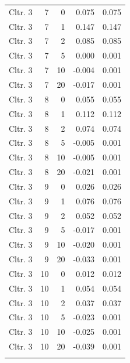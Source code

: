 \begin{longtable}{lrrrr}
  Cltr. 3 &    7 &    0 & 0.075 & 0.075 \\ 
  Cltr. 3 &    7 &    1 & 0.147 & 0.147 \\ 
  Cltr. 3 &    7 &    2 & 0.085 & 0.085 \\ 
  Cltr. 3 &    7 &    5 & 0.000 & 0.001 \\ 
  Cltr. 3 &    7 &   10 & -0.004 & 0.001 \\ 
  Cltr. 3 &    7 &   20 & -0.017 & 0.001 \\ 
  Cltr. 3 &    8 &    0 & 0.055 & 0.055 \\ 
  Cltr. 3 &    8 &    1 & 0.112 & 0.112 \\ 
  Cltr. 3 &    8 &    2 & 0.074 & 0.074 \\ 
  Cltr. 3 &    8 &    5 & -0.005 & 0.001 \\ 
  Cltr. 3 &    8 &   10 & -0.005 & 0.001 \\ 
  Cltr. 3 &    8 &   20 & -0.021 & 0.001 \\ 
  Cltr. 3 &    9 &    0 & 0.026 & 0.026 \\ 
  Cltr. 3 &    9 &    1 & 0.076 & 0.076 \\ 
  Cltr. 3 &    9 &    2 & 0.052 & 0.052 \\ 
  Cltr. 3 &    9 &    5 & -0.017 & 0.001 \\ 
  Cltr. 3 &    9 &   10 & -0.020 & 0.001 \\ 
  Cltr. 3 &    9 &   20 & -0.033 & 0.001 \\ 
  Cltr. 3 &   10 &    0 & 0.012 & 0.012 \\ 
  Cltr. 3 &   10 &    1 & 0.054 & 0.054 \\ 
  Cltr. 3 &   10 &    2 & 0.037 & 0.037 \\ 
  Cltr. 3 &   10 &    5 & -0.023 & 0.001 \\ 
  Cltr. 3 &   10 &   10 & -0.025 & 0.001 \\ 
  Cltr. 3 &   10 &   20 & -0.039 & 0.001 \\ 
   \bottomrule
\label{tab:AB_Mthau_sens}
\end{longtable}
